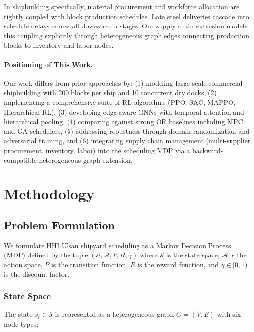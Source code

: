 \documentclass[11pt,a4paper]{article}
\begin{document}
In shipbuilding specifically, material procurement and workforce allocation are tightly coupled with block production schedules. Late steel deliveries cascade into schedule delays across all downstream stages. Our supply chain extension models this coupling explicitly through heterogeneous graph edges connecting production blocks to inventory and labor nodes.

\paragraph{Positioning of This Work.} Our work differs from prior approaches by: (1) modeling large-scale commercial shipbuilding with 200 blocks per ship and 10 concurrent dry docks, (2) implementing a comprehensive suite of RL algorithms (PPO, SAC, MAPPO, Hierarchical RL), (3) developing edge-aware GNNs with temporal attention and hierarchical pooling, (4) comparing against strong OR baselines including MPC and GA schedulers, (5) addressing robustness through domain randomization and adversarial training, and (6) integrating supply chain management (multi-supplier procurement, inventory, labor) into the scheduling MDP via a backward-compatible heterogeneous graph extension.

\section{Methodology}
\label{sec:methodology}

\subsection{Problem Formulation}

We formulate HHI Ulsan shipyard scheduling as a Markov Decision Process (MDP) defined by the tuple $(\mathcal{S}, \mathcal{A}, P, R, \gamma)$ where $\mathcal{S}$ is the state space, $\mathcal{A}$ is the action space, $P$ is the transition function, $R$ is the reward function, and $\gamma \in [0, 1)$ is the discount factor.

\subsubsection{State Space}

The state $s_t \in \mathcal{S}$ is represented as a heterogeneous graph $G = (V, E)$ with six node types:
\end{document}
